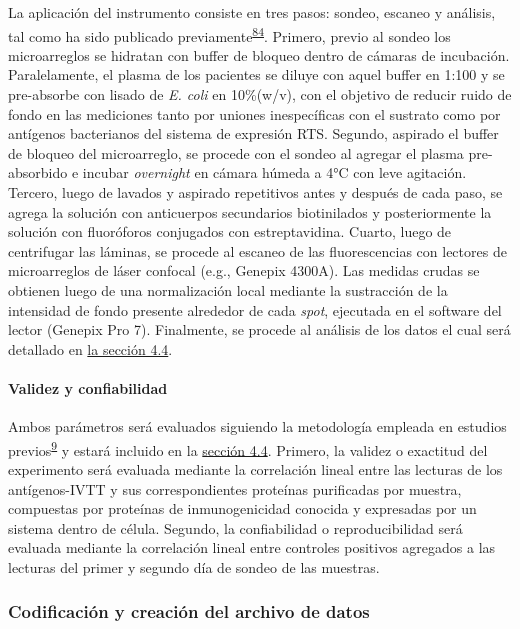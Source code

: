 \documentclass[]{article}
\let\oldparagraph\paragraph
\renewcommand{\paragraph}[1]{\oldparagraph{#1}\mbox{}}
\begin{document}
La aplicación del instrumento consiste en tres pasos: sondeo, escaneo y
análisis, tal como ha sido publicado
previamente\textsuperscript{\protect\hyperlink{ref-Driguez2015}{84}}.
Primero, previo al sondeo los microarreglos se hidratan con buffer de
bloqueo dentro de cámaras de incubación. Paralelamente, el plasma de los
pacientes se diluye con aquel buffer en 1:100 y se pre-absorbe con
lisado de \emph{E. coli} en 10\%(w/v), con el objetivo de reducir ruido
de fondo en las mediciones tanto por uniones inespecíficas con el
sustrato como por antígenos bacterianos del sistema de expresión RTS.
Segundo, aspirado el buffer de bloqueo del microarreglo, se procede con
el sondeo al agregar el plasma pre-absorbido e incubar \emph{overnight}
en cámara húmeda a 4°C con leve agitación. Tercero, luego de lavados y
aspirado repetitivos antes y después de cada paso, se agrega la solución
con anticuerpos secundarios biotinilados y posteriormente la solución
con fluoróforos conjugados con estreptavidina. Cuarto, luego de
centrifugar las láminas, se procede al escaneo de las fluorescencias con
lectores de microarreglos de láser confocal (e.g., Genepix 4300A). Las
medidas crudas se obtienen luego de una normalización local mediante la
sustracción de la intensidad de fondo presente alrededor de cada
\emph{spot}, ejecutada en el software del lector (Genepix Pro 7).
Finalmente, se procede al análisis de los datos el cual será detallado
en \protect\hyperlink{procanal}{la sección 4.4}.

\hypertarget{validez}{\paragraph{Validez y
confiabilidad}\label{validez}}

Ambos parámetros será evaluados siguiendo la metodología empleada en
estudios
previos\textsuperscript{\protect\hyperlink{ref-crompton2010}{9}} y
estará incluido en la \protect\hyperlink{procanal}{sección 4.4}.
Primero, la validez o exactitud del experimento será evaluada mediante
la correlación lineal entre las lecturas de los antígenos-IVTT y sus
correspondientes proteínas purificadas por muestra, compuestas por
proteínas de inmunogenicidad conocida y expresadas por un sistema dentro
de célula. Segundo, la confiabilidad o reproducibilidad será evaluada
mediante la correlación lineal entre controles positivos agregados a las
lecturas del primer y segundo día de sondeo de las muestras.

\subsubsection{Codificación y creación del archivo de
datos}\label{codificacion-y-creacion-del-archivo-de-datos}
\end{document}
